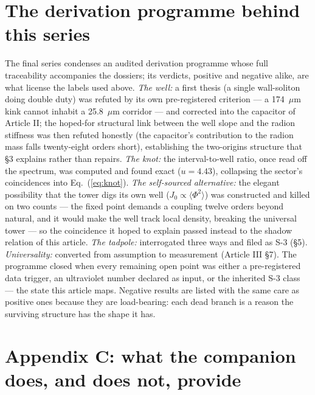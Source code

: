 \section{The derivation programme behind this series}
The final series condenses an audited derivation programme whose full traceability accompanies the dossiers; its verdicts, positive and negative alike, are what license the labels used above. \emph{The well:} a first thesis (a single wall-soliton doing double duty) was refuted by its own pre-registered criterion --- a 174~$\mu$m kink cannot inhabit a 25.8~$\mu$m corridor --- and corrected into the capacitor of Article II; the hoped-for structural link between the well slope and the radion stiffness was then refuted honestly (the capacitor's contribution to the radion mass falls twenty-eight orders short), establishing the two-origins structure that \S3 explains rather than repairs. \emph{The knot:} the interval-to-well ratio, once read off the spectrum, was computed and found exact ($u=4.43$), collapsing the sector's coincidences into Eq.~(\ref{eq:knot}). \emph{The self-sourced alternative:} the elegant possibility that the tower digs its own well ($J_{0}\propto\langle\Phi^{2}\rangle$) was constructed and killed on two counts --- the fixed point demands a coupling twelve orders beyond natural, and it would make the well track local density, breaking the universal tower --- so the coincidence it hoped to explain passed instead to the shadow relation of this article. \emph{The tadpole:} interrogated three ways and filed as S-3 (\S5). \emph{Universality:} converted from assumption to measurement (Article III \S7). The programme closed when every remaining open point was either a pre-registered data trigger, an ultraviolet number declared as input, or the inherited S-3 class --- the state this article maps. Negative results are listed with the same care as positive ones because they are load-bearing: each dead branch is a reason the surviving structure has the shape it has.



\toolsstatement
{}


\section*{Appendix C: what the companion does, and does not, provide}
\label{app:companion}

